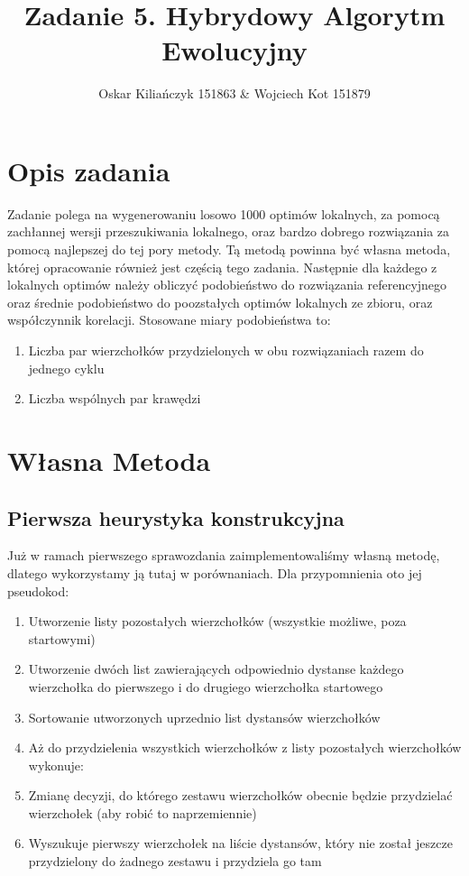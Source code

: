 \documentclass[11pt]{article}
\title{Zadanie 5. Hybrydowy Algorytm Ewolucyjny}
\author{Oskar Kiliańczyk 151863 \& Wojciech Kot 151879}
\date{}
\begin{document}
\maketitle
\newpage

\section{Opis zadania}\label{sec:opis-zadania}
Zadanie polega na wygenerowaniu losowo 1000 optimów lokalnych, za pomocą zachłannej wersji przeszukiwania lokalnego,
oraz bardzo dobrego rozwiązania za pomocą najlepszej do tej pory metody.
Tą metodą powinna być własna metoda, której opracowanie również jest częścią tego zadania.
Następnie dla każdego z lokalnych optimów należy obliczyć podobieństwo do rozwiązania referencyjnego oraz średnie podobieństwo do poozstałych optimów lokalnych ze zbioru, oraz współczynnik korelacji.
Stosowane miary podobieństwa to:
\begin{enumerate}
    \item Liczba par wierzchołków przydzielonych w obu rozwiązaniach razem do jednego cyklu
    \item Liczba wspólnych par krawędzi
\end{enumerate}


\section{Własna Metoda}\label{sec:wasna-metoda}

\subsection{Pierwsza heurystyka konstrukcyjna}\label{subsec:pierwsza-heurystyka-konstukcyjna}

Już w ramach pierwszego sprawozdania zaimplementowaliśmy własną metodę, dlatego wykorzystamy ją tutaj w porównaniach.
Dla przypomnienia oto jej pseudokod:

\begin{enumerate}
    \item Utworzenie listy pozostałych wierzchołków (wszystkie możliwe, poza startowymi)
    \item Utworzenie dwóch list zawierających odpowiednio dystanse każdego wierzchołka do pierwszego i do drugiego wierzchołka startowego
    \item Sortowanie utworzonych uprzednio list dystansów wierzchołków
    \item Aż do przydzielenia wszystkich wierzchołków z listy pozostałych wierzchołków wykonuje:
    \item Zmianę decyzji, do którego zestawu wierzchołków obecnie będzie przydzielać wierzchołek (aby robić to naprzemiennie)
    \item Wyszukuje pierwszy wierzchołek na liście dystansów, który nie został jeszcze przydzielony do żadnego zestawu i przydziela go tam
\end{enumerate}
\end{document}
